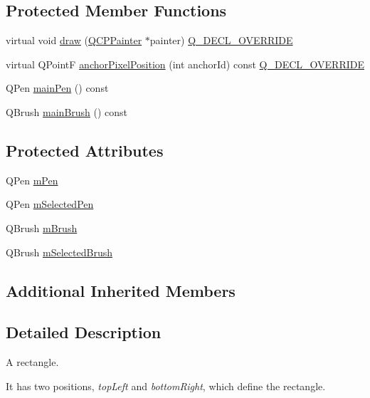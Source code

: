 \subsection*{Protected Member Functions}
\begin{DoxyCompactItemize}
\item 
virtual void \hyperlink{class_q_c_p_item_rect_a3c492960d0fc038cf1b60578b62b6cdc}{draw} (\hyperlink{class_q_c_p_painter}{Q\+C\+P\+Painter} $\ast$painter) \hyperlink{qcustomplot_8h_a42cc5eaeb25b85f8b52d2a4b94c56f55}{Q\+\_\+\+D\+E\+C\+L\+\_\+\+O\+V\+E\+R\+R\+I\+DE}
\item 
virtual Q\+PointF \hyperlink{class_q_c_p_item_rect_a844027325b33a3b7eef424128ee5109c}{anchor\+Pixel\+Position} (int anchor\+Id) const \hyperlink{qcustomplot_8h_a42cc5eaeb25b85f8b52d2a4b94c56f55}{Q\+\_\+\+D\+E\+C\+L\+\_\+\+O\+V\+E\+R\+R\+I\+DE}
\item 
Q\+Pen \hyperlink{class_q_c_p_item_rect_af94d87da501e9429c0e874f1c0369b03}{main\+Pen} () const
\item 
Q\+Brush \hyperlink{class_q_c_p_item_rect_a8813d2d670835ac9b8000c981b8ea6fe}{main\+Brush} () const
\end{DoxyCompactItemize}
\subsection*{Protected Attributes}
\begin{DoxyCompactItemize}
\item 
Q\+Pen \hyperlink{class_q_c_p_item_rect_aa0d49323628d6752026056bfb52afd86}{m\+Pen}
\item 
Q\+Pen \hyperlink{class_q_c_p_item_rect_a73cc0bee61de3c67221ec8c7a76a29ed}{m\+Selected\+Pen}
\item 
Q\+Brush \hyperlink{class_q_c_p_item_rect_a2d7f207fada27588b3a52b19234d3c2e}{m\+Brush}
\item 
Q\+Brush \hyperlink{class_q_c_p_item_rect_a21b70eee59b6e19ae0bbdf037b13508f}{m\+Selected\+Brush}
\end{DoxyCompactItemize}
\subsection*{Additional Inherited Members}


\subsection{Detailed Description}
A rectangle. 

 It has two positions, {\itshape top\+Left} and {\itshape bottom\+Right}, which define the rectangle. 

